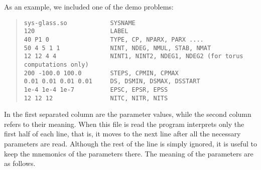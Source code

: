 \documentclass[10pt,a4paper]{ddedoc}
\begin{document}
As an example, we included one of the demo problems:
{ \small \begin{quote} \begin{lstlisting}[basicstyle=\tt,frame=single]
sys-glass.so            SYSNAME
120                     LABEL
40 P1 0                 TYPE, CP, NPARX, PARX ....
50 4 5 1 1              NINT, NDEG, NMUL, STAB, NMAT
12 12 4 4               NINT1, NINT2, NDEG1, NDEG2 (for torus computations only)
200 -100.0 100.0        STEPS, CPMIN, CPMAX
0.01 0.01 0.01 0.01     DS, DSMIN, DSMAX, DSSTART
1e-4 1e-4 1e-7          EPSC, EPSR, EPSS
12 12 12                NITC, NITR, NITS
\end{lstlisting} \end{quote} } \noindent
In the first separated column are the parameter values, while the second column refers to their meaning. 
When this file is read the program interprets only the first half of each line, that is, it moves to the next line
after all the necessary parameters are read. Although the rest of the line is simply ignored, 
it is useful to keep the mnemonics of the parameters there. The meaning of the parameters are as
follows.
\end{document}
